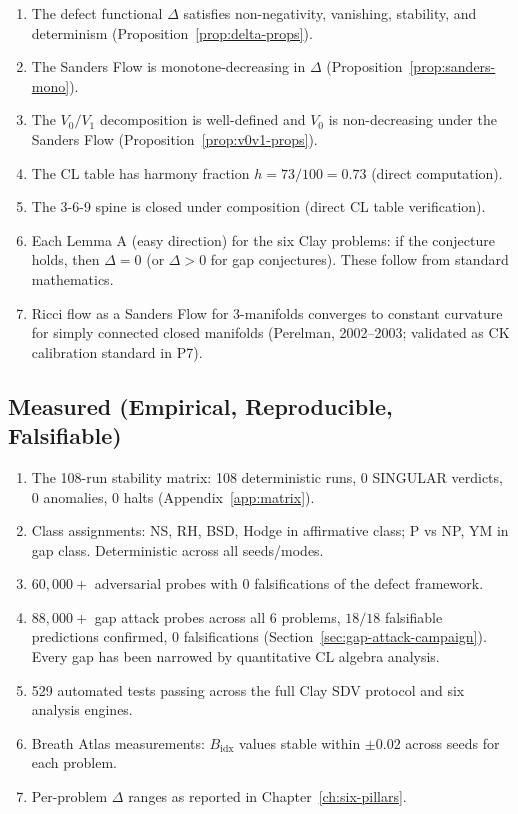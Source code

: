 \documentclass[12pt, openany]{book}
\theoremstyle{remark}
\begin{document}
\begin{enumerate}
  \item The defect functional $\Delta$ satisfies non-negativity, vanishing,
        stability, and determinism (Proposition~\ref{prop:delta-props}).
  \item The Sanders Flow is monotone-decreasing in $\Delta$
        (Proposition~\ref{prop:sanders-mono}).
  \item The $V_0/V_1$ decomposition is well-defined and $V_0$ is non-decreasing
        under the Sanders Flow (Proposition~\ref{prop:v0v1-props}).
  \item The CL table has harmony fraction $h = 73/100 = 0.73$
        (direct computation).
  \item The 3-6-9 spine is closed under composition (direct CL table verification).
  \item Each Lemma A (easy direction) for the six Clay problems: if the conjecture
        holds, then $\Delta = 0$ (or $\Delta > 0$ for gap conjectures). These
        follow from standard mathematics.
  \item Ricci flow as a Sanders Flow for 3-manifolds converges to constant curvature
        for simply connected closed manifolds (Perelman, 2002--2003; validated as
        CK calibration standard in P7).
\end{enumerate}

\subsection{Measured (Empirical, Reproducible, Falsifiable)}

\begin{enumerate}
  \item The 108-run stability matrix: 108 deterministic runs, 0 SINGULAR verdicts,
        0 anomalies, 0 halts (Appendix~\ref{app:matrix}).
  \item Class assignments: NS, RH, BSD, Hodge in affirmative class;
        P vs NP, YM in gap class. Deterministic across all seeds/modes.
  \item $60{,}000{+}$ adversarial probes with 0 falsifications of the defect
        framework.
  \item $88{,}000{+}$ gap attack probes across all 6 problems, $18/18$
        falsifiable predictions confirmed, 0 falsifications
        (Section~\ref{sec:gap-attack-campaign}).  Every gap has been narrowed
        by quantitative CL algebra analysis.
  \item 529 automated tests passing across the full Clay SDV protocol and
        six analysis engines.
  \item Breath Atlas measurements: $B_{\mathrm{idx}}$ values stable within
        $\pm 0.02$ across seeds for each problem.
  \item Per-problem $\Delta$ ranges as reported in Chapter~\ref{ch:six-pillars}.
\end{enumerate}
\end{document}
